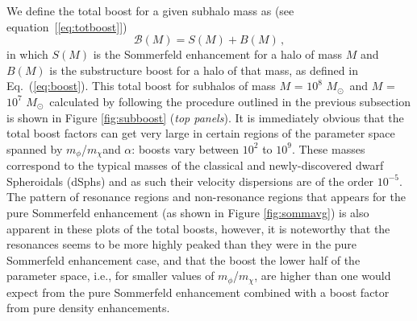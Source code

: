 \documentclass[aps,prd,twocolumn,amsmath,amssymb,floatfix,nofootinbib,10pt]{revtex4}
\newcommand{\ie}{i.e.}
\newcommand{\somm}{\ensuremath{S}}
\newcommand{\mdm}{\ensuremath{m_{\chi}}}
\newcommand{\mv}{\ensuremath{m_{\phi}}}
\newcommand{\eqnname}{equation}
\newcommand{\boost}{\ensuremath{B}}
\newcommand{\totalboost}{\ensuremath{\mathcal{B}}}
\newcommand{\Msol}{\ensuremath{M_{\odot}}}
\newcommand{\Msun}{\Msol}
\newcommand{\dSphs}{dSphs}
\begin{document}
We define the total boost for a given subhalo mass as (see \eqnname\
[\ref{eq:totboost}])
\begin{equation}\label{eq:totalboost}
\totalboost(M) = \somm(M) + \boost(M)\, ,
\end{equation}
in which $\somm(M)$ is the Sommerfeld enhancement for a halo of mass
$M$ and $\boost(M)$ is the substructure boost for a halo of that mass,
as defined in Eq.~(\ref{eq:boost}). This total boost for subhalos of
mass $M$ = $10^8$ \Msun\ and $M$ = $10^7$ \Msun\ calculated by
following the procedure outlined in the previous subsection is shown
in Figure \ref{fig:subboost} (\emph{top panels}). It is immediately
obvious that the total boost factors can get very large in certain
regions of the parameter space spanned by \mv/\mdm and $\alpha$:
boosts vary between $10^2$ to $10^9$. These masses correspond to the
typical masses of the classical and newly-discovered dwarf Spheroidals
(\dSphs) and as such their velocity dispersions are of the order
$10^{-5}$. The pattern of resonance regions and non-resonance regions
that appears for the pure Sommerfeld enhancement (as shown in Figure
\ref{fig:sommavg}) is also apparent in these plots of the total
boosts, however, it is noteworthy that the resonances seems to be more
highly peaked than they were in the pure Sommerfeld enhancement case,
and that the boost the lower half of the parameter space, \ie, for
smaller values of \mv/\mdm, are higher than one would expect from the
pure Sommerfeld enhancement combined with a boost factor from pure
density enhancements.
\end{document}

